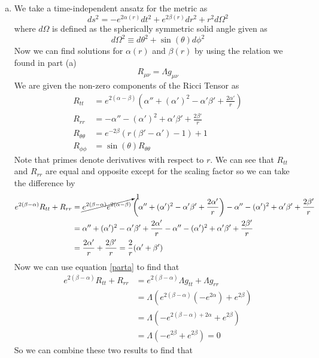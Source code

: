\documentclass[11pt]{article}
\numberwithin{equation}{section}
\begin{document}
\begin{enumerate}[(a)]
\item
We take a time-independent ansatz for the metric as
\begin{equation}
ds^2 = -e^{2\alpha(r)}dt^2 + e^{2\beta(r)}dr^2 + r^2d\Omega^2
\label{ansatz}
\end{equation}
where $d\Omega$ is defined as the spherically symmetric solid angle given as
$$d\Omega^2 \equiv d\theta^2 + \sin(\theta)d\phi^2$$
Now we can find solutions for $\alpha(r)$ and $\beta(r)$ by using the relation we found in part (a)
\begin{equation}
R_{\mu\nu} = \Lambda g_{\mu\nu}
\label{parta}
\end{equation}
We are given the non-zero components of the Ricci Tensor as
\begin{align*}
R_{tt} &= e^{2(\alpha-\beta)}\left(\alpha''+(\alpha')^2-\alpha'\beta'+\frac{2\alpha'}{r}\right)\\
R_{rr} &= -\alpha''-(\alpha')^2 + \alpha'\beta'+\frac{2\beta'}{r}\\
R_{\theta\theta} &= e^{-2\beta}\left(r(\beta'-\alpha')-1\right)+1\\
R_{\phi\phi} &= \sin(\theta)R_{\theta\theta}
\end{align*}
Note that primes denote derivatives with respect to $r$. We can see that $R_{tt}$ and $R_{rr}$ are equal and opposite except for the scaling factor so we can take the difference by
\begin{align*}
e^{2(\beta-\alpha)}R_{tt} + R_{rr} &= \cancelto{1}{e^{2(\beta-\alpha)}e^{2(\alpha-\beta)}}\left(\alpha''+(\alpha')^2-\alpha'\beta'+\frac{2\alpha'}{r}\right)  -\alpha''-(\alpha')^2 + \alpha'\beta'+\frac{2\beta'}{r}\\
&= \alpha''+(\alpha')^2-\alpha'\beta'+\frac{2\alpha'}{r}  -\alpha''-(\alpha')^2 + \alpha'\beta'+\frac{2\beta'}{r}\\
&= \frac{2\alpha'}{r}   + \frac{2\beta'}{r} = \frac{2}{r}(\alpha'+\beta')
\end{align*}
Now we can use equation \ref{parta} to find that
\begin{align*}
e^{2(\beta-\alpha)}R_{tt} + R_{rr} &= e^{2(\beta-\alpha)}\Lambda g_{tt} + \Lambda g_{rr}\\
&= \Lambda\left(e^{2(\beta-\alpha)}\left(-e^{2\alpha}\right) + e^{2\beta}\right)\\
&= \Lambda\left(-e^{2(\beta-\alpha)+2\alpha} + e^{2\beta}\right)\\
&= \Lambda\left(-e^{2\beta} + e^{2\beta}\right) = 0
\end{align*}
So we can combine these two results to find that

\end{enumerate}
\end{document}
